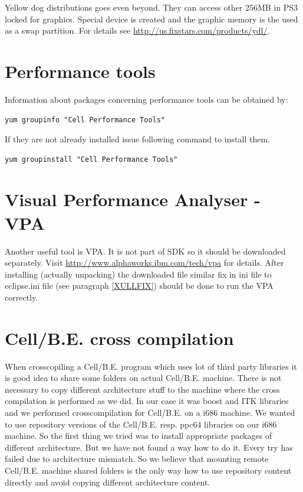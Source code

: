 \par
Yellow dog distributions goes even beyond. They can access other 256MB in PS3 locked for graphics.
Special device is created and the graphic memory is the used as a swap partition. For details see \url{http://us.fixstars.com/products/ydl/}.

\section{Performance tools}

Information about packages concerning performance tools can be obtained by:
\begin{verbatim}
yum groupinfo "Cell Performance Tools"
\end{verbatim}
If they are not already installed issue following command to install them.
\begin{verbatim}
yum groupinstall "Cell Performance Tools"
\end{verbatim}

\section{Visual Performance Analyser - VPA}

Another useful tool is VPA. It is not part of SDK so it should be downloaded separately.
Visit \url{http://www.alphaworks.ibm.com/tech/vpa} for details.
After installing (actually unpacking) the downloaded file similar fix in ini file to eclipse.ini file (see paragraph \ref{XULLFIX}) should be done to run the VPA correctly.

\section{Cell/B.E. cross compilation}

When crosscopiling a Cell/B.E. program which uses lot of third party libraries it is good idea to share some folders on actual Cell/B.E. machine.
There is not necessary to copy different architecture stuff to the machine where the cross compilation is performed as we did.
In our case it was boost and ITK libraries and we performed crosscompilation for Cell/B.E. on a i686 machine.
We wanted to use repository versions of the Cell/B.E. resp. ppc64 libraries on our i686 machine.
So the first thing we tried was to install appropriate packages of different architecture.
But we have not found a way how to do it.
Every try has failed due to architecture mismatch.
So we believe that mounting remote Cell/B.E. machine shared folders is the only way how to use repository content directly and avoid copying different architecture content.
